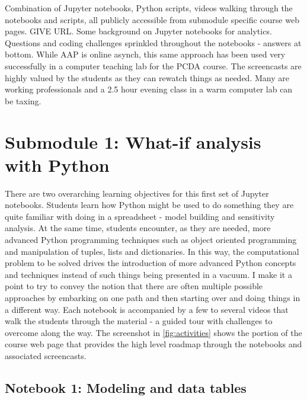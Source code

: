 \documentclass[ited,blindrev]{informs3}              %
\begin{document}
Combination of Jupyter notebooks, Python scripts, videos walking through the notebooks and scripts, all publicly accessible from submodule specific course web pages. GIVE URL. Some background on Jupyter notebooks for analytics. Questions and coding challenges sprinkled throughout the notebooks - answers at bottom. While AAP is online asynch, this same approach has been used very successfully in a computer teaching lab for the PCDA course. The screencasts are highly valued by the students as they can rewatch things as needed. Many are working professionals and a 2.5 hour evening class in a warm computer lab can be taxing.

\section{Submodule 1: What-if analysis with Python}

There are two overarching learning objectives for this first set of Jupyter notebooks. Students learn how Python might be used to do something they are quite familiar with doing in a spreadsheet - model building and sensitivity analysis. At the same time, students encounter, as they are needed, more advanced Python programming techniques such as object oriented programming and manipulation of tuples, lists and dictionaries. In this way, the computational problem to be solved drives the introduction of more advanced Python concepts and techniques instead of such things being presented in a vacuum. I make it a point to try to convey the notion that there are often multiple possible approaches by embarking on one path and then starting over and doing things in a different way. Each notebook is accompanied by a few to several videos that walk the students through the material - a guided tour with challenges to overcome along the way. The screenshot in \ref{fig:activities} shows the portion of the course web page that provides the high level roadmap through the notebooks and associated screencasts.
 
 
\subsection{Notebook 1: Modeling and data tables}
\end{document}
